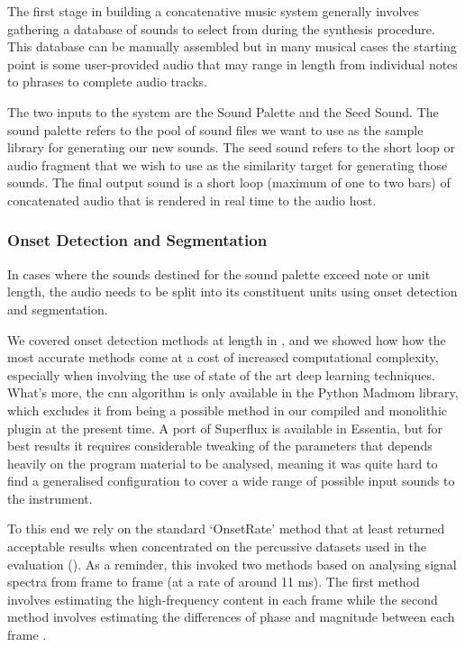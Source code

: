 The first stage in building a concatenative music system generally involves gathering a database of sounds to select from during the synthesis procedure. This database can be manually assembled but in many musical cases the starting point is some user-provided audio that may range in length from individual notes to phrases to complete audio tracks.
 
The two inputs to the system are the Sound Palette and the Seed Sound. The sound palette refers to the pool of sound files we want to use as the sample library for generating our new sounds. The seed sound refers to the short loop or audio fragment that we wish to use as the similarity target for generating those sounds. The final output sound is a short loop (maximum of one to two bars) of concatenated audio that is rendered in real time to the audio host.

\subsubsection{Onset Detection and Segmentation}

In cases where the sounds destined for the sound palette exceed note or unit length, the audio needs to be split into its constituent units using onset detection and segmentation.

We covered onset detection methods at length in , and we showed how how the most accurate methods come at a cost of increased computational complexity, especially when involving the use of state of the art deep learning techniques. What's more, the \acrshort{cnn} algorithm \citep{Schluter2013} is only available in the Python Madmom library, which excludes it from being a possible method in our compiled and monolithic plugin at the present time. A port of Superflux is available in Essentia, but for best results it requires considerable tweaking of the parameters that depends heavily on the program material to be analysed, meaning it was quite hard to find a generalised configuration to cover a wide range of possible input sounds to the instrument. 

To this end we rely on the standard `OnsetRate' method that at least returned acceptable results when concentrated on the percussive datasets used in the evaluation (). As a reminder, this invoked two methods based on analysing signal spectra from frame to frame (at a rate of around 11 ms). The first method involves estimating the high-frequency content in each frame \citep{Masri1996} while the second method involves estimating the differences of phase and magnitude between each frame \citep{Bello2005}.

